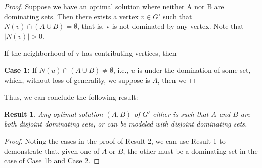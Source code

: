 \documentclass{article}
\newtheorem{result}{Result}
\begin{document}
\begin{proof}
Suppose we have an optimal solution where neither A nor B are dominating sets. Then there exists a vertex $v \in G'$ such that $N(v) \cap (A \cup B) = \emptyset$, that is, v is not dominated by any vertex. Note that $|N(v)| > 0$. 

If the neighborhood of v has contributing vertices, then

\textbf{Case 1:} If $N(u) \cap (A \cup B) \neq \emptyset$, i.e., $u$ is under the domination of some set, which, without loss of generality, we suppose is $A$, then we
\end{proof}

Thus, we can conclude the following result:

\begin{result}
    Any optimal solution $(A,B)$ of $G'$ either is such that $A$ and $B$ are both disjoint dominating sets, or can be modeled with disjoint dominating sets. 
\end{result}
\begin{proof}
    Noting the cases in the proof of Result 2, we can use Result 1 to demonstrate that, given one of $A$ or $B$, the other must be a dominating set in the case of Case 1b and Case 2. 
\end{proof}
\end{document}

